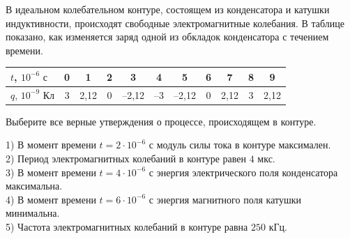 \begin{taskbasic}[code={\label{task:elem_osc_v25_n14}}]
В идеальном колебательном контуре, состоящем из конденсатора и катушки индуктивности, происходят свободные электромагнитные колебания. В таблице показано, как изменяется заряд одной из обкладок конденсатора с течением времени.

\nopagebreak\smallskip
\begin{center}
\small
\begin{tabular}{|l|c|c|c|c|c|c|c|c|c|c|}
\hline
$t$, $10^{-6}\text{ с}$ & 0 & 1 & 2 & 3 & 4 & 5 & 6 & 7 & 8 & 9 \\ \hline
$q$, $10^{-9}\text{ Кл}$ & 3 & 2,12 & 0 & --2,12 & --3 & --2,12 & 0 & 2,12 & 3 & 2,12 \\ \hline
\end{tabular}
\end{center}
\smallskip

Выберите все верные утверждения о процессе, происходящем в контуре.

1) В момент времени $t = 2\cdot 10^{-6}\text{ с}$ модуль силы тока в контуре максимален.\\
2) Период электромагнитных колебаний в контуре равен $4\text{ мкс}$.\\
3) В момент времени $t = 4\cdot 10^{-6}\text{ с}$ энергия электрического поля конденсатора максимальна.\\
4) В момент времени $t = 6\cdot 10^{-6}\text{ с}$ энергия магнитного поля катушки минимальна.\\
5) Частота электромагнитных колебаний в контуре равна $250\text{ кГц}$.

\end{taskbasic}

